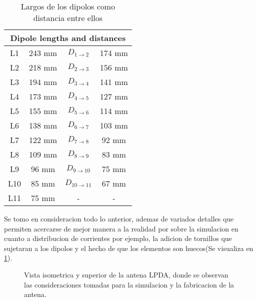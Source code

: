 \begin{table}
\begin{subtable}[b]{0.45\linewidth}
        \centering
        \begin{tabular}{cccc}
            \multicolumn{4}{c}{Dipole lengths and distances} \\
            \hline
            L1 & 243 mm & $D_{1 \rightarrow 2}$ & 174 mm \\
            L2 & 218 mm & $D_{2 \rightarrow 3}$ & 156 mm \\
            L3 & 194 mm & $D_{3 \rightarrow 4}$ & 141 mm \\
            L4 & 173 mm & $D_{4 \rightarrow 5}$ & 127 mm \\
            L5 & 155 mm & $D_{5 \rightarrow 6}$ & 114 mm \\
            L6 & 138 mm & $D_{6 \rightarrow 7}$ & 103 mm \\
            L7 & 122 mm & $D_{7 \rightarrow 8}$ & 92 mm \\
            L8 & 109 mm & $D_{8 \rightarrow 9}$ & 83 mm \\
            L9 & 96 mm & $D_{9 \rightarrow 10}$ & 75 mm \\
            L10 & 85 mm & $D_{10 \rightarrow 11}$ & 67 mm \\
            L11 & 75 mm & - & - \\
        \end{tabular}
        \caption{Largos de los dipolos como distancia entre ellos}
        \label{tab:Parametros_optimizados}
    \end{subtable}
\end{table}
Se tomo en consideracion todo lo anterior, ademas de variados detalles que permiten acercarse de mejor manera a la realidad por sobre la simulacion en cuanto a distribucion de corrientes por ejemplo, la adicion de tornillos que sujetaran a los dipolos y el hecho de que los elementos son huecos(Se visualiza en \ref{fig:vistas_antena}).
\begin{figure}[H]
    \centering
    \quad
    \caption{Vista isometrica y superior de la antena LPDA, donde se observan las consideraciones tomadas para la simulacion y la fabricacion de la antena.}
    \label{fig:vistas_antena}
\end{figure}
